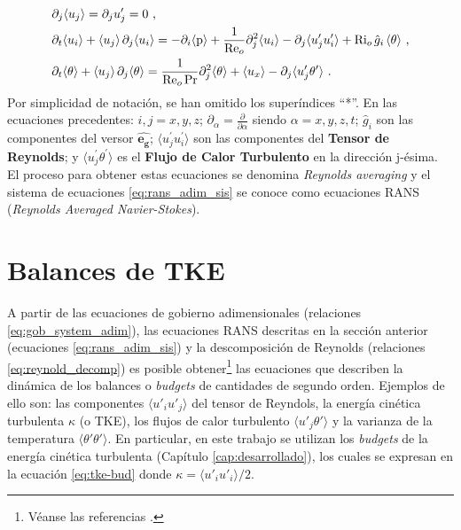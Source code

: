 \begin{equation}
\begin{aligned}
& \partial_j \langle u_j \rangle = \partial_j  u^{\prime}_j = 0 \text{ ,}\\
& \partial_t \langle u_i \rangle + \langle u_j \rangle \hspace{0.5mm} \partial_j \langle u_i \rangle = - \partial_i  \langle \text{p} \rangle  + \frac{1}{\text{Re}_o} \partial^2_j \langle u_i \rangle - \partial_j \langle u^{\prime}_j u^{\prime}_i \rangle + \text{Ri}_o \hspace{0.5mm} \hat{g}_i \hspace{0.5mm} \langle \theta \rangle  \text{ ,} \\
& \partial_t \langle \theta \rangle + \langle u_j \rangle \hspace{0.5mm} \partial_j \langle \theta \rangle = \frac{1}{\text{Re}_o \hspace{0.5mm} \text{Pr}} \partial^2_j \langle \theta \rangle + \langle u_x \rangle - \partial_j \langle u^{\prime}_j \theta^{\prime} \rangle  \text{ .}
\label{eq:rans_adim_sis}
\end{aligned}
\end{equation} 
Por simplicidad de notación, se han omitido los superíndices ``*''. En las ecuaciones precedentes: $i,j=x,y,z$; $\partial_{\alpha} = \frac{\partial}{\partial \alpha }$ siendo ${\alpha}=x,y,z,t$; $\hat{g}_i$ son las componentes del versor $\widehat{\mathbf{e_g}}$; $\langle u^{\prime}_j u^{\prime}_i \rangle$ son las componentes del \textbf{Tensor de Reynolds}; y $\langle u^{\prime}_j \theta^{\prime} \rangle$ es el \textbf{Flujo de Calor Turbulento} en la dirección j-ésima. El proceso para obtener estas ecuaciones se denomina \textit{Reynolds averaging} y el sistema de ecuaciones \ref{eq:rans_adim_sis} se conoce como ecuaciones RANS (\textit{Reynolds Averaged Navier-Stokes}).


\section{Balances de TKE}

A partir de las ecuaciones de gobierno adimensionales (relaciones \ref{eq:gob_system_adim}), las ecuaciones RANS descritas en la sección anterior (ecuaciones \ref{eq:rans_adim_sis}) y la descomposición de Reynolds (relaciones \ref{eq:reynold_decomp}) es posible obtener\footnote{Véanse las referencias \cite{pope2001turbulent, kundu, durbin}.} las ecuaciones que describen la dinámica de los balances o \textit{budgets} de cantidades de segundo orden. Ejemplos de ello son: las componentes $\langle u'_i u'_j \rangle$ del tensor de Reyndols, la energía cinética turbulenta $\kappa$ (o TKE), los flujos de calor turbulento $\langle u'_j \theta' \rangle$ y la varianza de la temperatura $\langle \theta' \theta' \rangle$. En particular, en este trabajo se utilizan los \textit{budgets} de la energía cinética turbulenta (Capítulo \ref{cap:desarrollado}), los cuales se expresan en la ecuación \ref{eq:tke-bud} donde $\kappa = \langle u'_i u'_i \rangle / 2$.  


